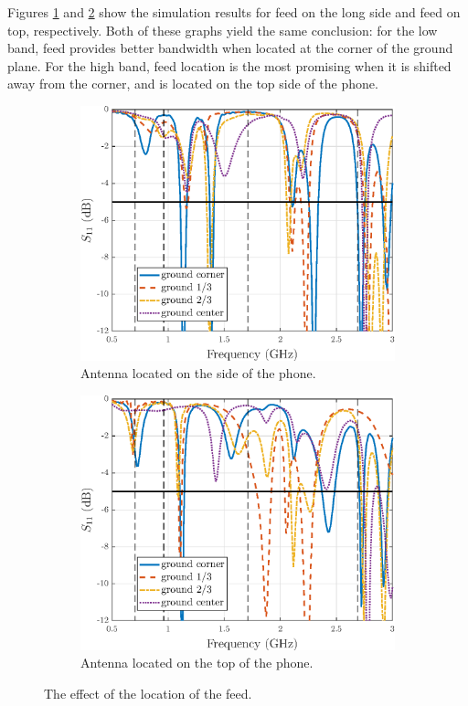 Figures \ref{fig:feed_pos_side_res} and \ref{fig:feed_pos_top_res} show the simulation results for feed on the long side and feed on top, respectively. Both of these graphs yield the same conclusion: for the low band, feed provides better bandwidth when located at the corner of the ground plane. For the high band, feed location is the most promising when it is shifted away from the corner, and is located on the top side of the phone.

\begin{figure}[H]
    \centering
    \begin{subfigure}[b]{0.49\textwidth}
        \includegraphics[width=\textwidth]{img/feed_pos_side_res.eps}
        \caption{Antenna located on the side of the phone.}
        \label{fig:feed_pos_side_res}
    \end{subfigure}
    \begin{subfigure}[b]{0.49\textwidth}
        \includegraphics[width=\textwidth]{img/feed_pos_top_res.eps}
        \caption{Antenna located on the top of the phone.}
        \label{fig:feed_pos_top_res}
    \end{subfigure}
    \caption{The effect of the location of the feed.}
    \label{fig:feed_effect}
\end{figure}


